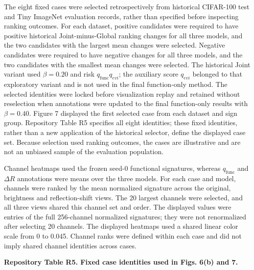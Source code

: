 \documentclass[11pt,a4paper]{article}
\begin{document}
The eight fixed cases were selected retrospectively from historical CIFAR-100 test and Tiny ImageNet evaluation records, rather than specified before inspecting ranking outcomes. For each dataset, positive candidates were required to have positive historical Joint-minus-Global ranking changes for all three models, and the two candidates with the largest mean changes were selected. Negative candidates were required to have negative changes for all three models, and the two candidates with the smallest mean changes were selected. The historical Joint variant used \(\beta = 0.20\) and risk \(q_{\text{func}}q_{evi}\); the auxiliary score \(q_{evi}\) belonged to that exploratory variant and is not used in the final function-only method. The selected identities were locked before visualization replay and retained without reselection when annotations were updated to the final function-only results with \(\beta = 0.40\). Figure 7 displayed the first selected case from each dataset and sign group. Repository Table R5 specifies all eight identities; these fixed identities, rather than a new application of the historical selector, define the displayed case set. Because selection used ranking outcomes, the cases are illustrative and are not an unbiased sample of the evaluation population.

Channel heatmaps used the frozen seed-0 functional signatures, whereas \(q_{\text{func}}\) and \(\Delta R\) annotations were means over the three models. For each case and model, channels were ranked by the mean normalized signature across the original, brightness and reflection-shift views. The 20 largest channels were selected, and all three views shared this channel set and order. The displayed values were entries of the full 256-channel normalized signatures; they were not renormalized after selecting 20 channels. The displayed heatmaps used a shared linear color scale from 0 to 0.045. Channel ranks were defined within each case and did not imply shared channel identities across cases.

\textbf{Repository Table R5. Fixed case identities used in Figs. 6(b) and 7.}
\end{document}
